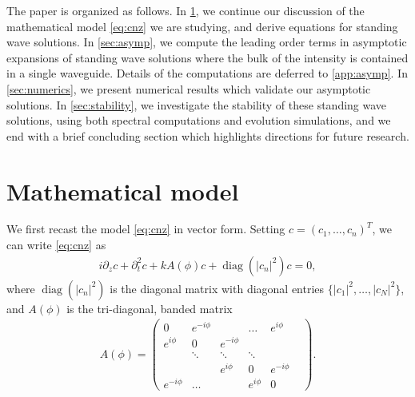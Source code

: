 \documentclass[11pt,reqno]{amsart}
\DeclareMathOperator{\diag}{diag}
\begin{document}
The paper is organized as follows. In \cref{sec:model}, we continue our discussion of the mathematical model \cref{eq:cnz} we are studying, %
and derive equations for standing wave solutions. In \cref{sec:asymp}, we compute the leading order terms in asymptotic expansions of standing wave solutions where the bulk of the intensity is contained in a single waveguide. Details of the computations are deferred to \cref{app:asymp}. In \cref{sec:numerics}, we present numerical results which validate our asymptotic solutions. In \cref{sec:stability}, we investigate the stability of these standing wave solutions, using both spectral computations and evolution simulations, and we end with a brief concluding section which highlights directions for future research.

\section{Mathematical model}\label{sec:model}

We first recast the model \cref{eq:cnz} in vector form. Setting $c = (c_1, \dots, c_n)^T$, we can write \cref{eq:cnz} as
\begin{align}\label{eq:cz}
i \partial_z c + \partial_t^2 c + k A(\phi) c + \diag\left(|c_n|^2\right)c = 0,
\end{align}
where $\diag\left(|c_n|^2\right)$ is the diagonal matrix with diagonal entries $\{|c_1|^2, \dots, |c_N|^2\}$, and $A(\phi)$ is the %
tri-diagonal, banded matrix
\begin{align}
A(\phi) = \begin{pmatrix}
0 & e^{-i \phi} & & \dots & e^{i \phi} \\
e^{i \phi} & 0 & e^{-i \phi} & & & \\
& \ddots & \ddots & \ddots &  & \\
 & &e^{i \phi}  & 0 & e^{-i \phi}  \\
e^{-i \phi}& \dots & & e^{i \phi} & 0
\end{pmatrix}.
\end{align}
\end{document}
